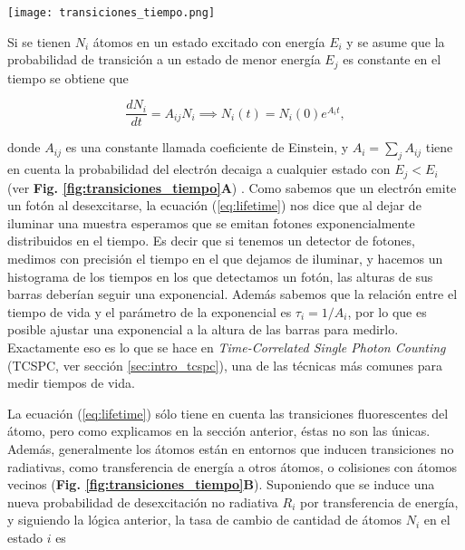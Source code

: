 \begin{SCfigure}
    \centering
    \texttt{[image: transiciones\_tiempo.png]}
    \caption{\textbf{Diagrama de Jablonski} con transiciones que contribuyen al tiempo de vida.\textbf{(A)} Sólo transiciones de fluorescencia. \textbf{(B)} Transiciones de fluorescencia y choques. Tomado y adaptado de \cite{demtroder_emission_2010}.}
    \label{fig:transiciones_tiempo}
\end{SCfigure}

Si se tienen $N_i$ átomos en un estado excitado con energía $E_i$ y se asume que la probabilidad de transición a un estado de menor energía $E_j$ es constante en el tiempo se obtiene que

\begin{equation} \label{eq:lifetime}
    \frac{dN_i}{dt} = A_{ij} N_i \implies N_i(t) = N_i(0)e^{A_i t},
\end{equation}

\noindent donde $A_{ij}$ es una constante llamada coeficiente de Einstein, y $A_i = \sum_{j} A_{ij}$ tiene en cuenta la probabilidad del electrón decaiga a cualquier estado con $E_j < E_i$ (ver \textbf{Fig. \ref{fig:transiciones_tiempo}A}) \cite{demtroder_emission_2010}.
Como sabemos que un electrón emite un fotón al desexcitarse, la ecuación (\ref{eq:lifetime}) nos dice que al dejar de iluminar una muestra esperamos que se emitan fotones exponencialmente distribuidos en el tiempo.
Es decir que si tenemos un detector de fotones, medimos con precisión el tiempo en el que dejamos de iluminar, y hacemos un histograma de los tiempos en los que detectamos un fotón, las alturas de sus barras deberían seguir una exponencial.
Además sabemos que la relación entre el tiempo de vida y el parámetro de la exponencial es $\tau_i = 1/A_i$, por lo que es posible ajustar una exponencial a la altura de las barras para medirlo.
Exactamente eso es lo que se hace en \textit{Time-Correlated Single Photon Counting} (TCSPC, ver sección \ref{sec:intro_tcspc}), una de las técnicas más comunes para medir tiempos de vida.

La ecuación (\ref{eq:lifetime}) sólo tiene en cuenta las transiciones fluorescentes del átomo, pero como explicamos en la sección anterior, éstas no son las únicas.
Además, generalmente los átomos están en entornos que inducen transiciones no radiativas, como transferencia de energía a otros átomos, o colisiones con átomos vecinos (\textbf{Fig. \ref{fig:transiciones_tiempo}B}). 
Suponiendo que se induce una nueva probabilidad de desexcitación no radiativa $R_i$ por transferencia de energía, y siguiendo la lógica anterior, la tasa de cambio de cantidad de átomos $N_i$ en el estado $i$ es

